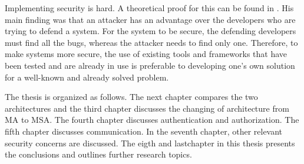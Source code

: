\begin{sloppypar}
    Implementing security is hard. A theoretical proof for this can be found in
    \citet{andersson2001information}. His main finding was that an attacker has
    an advantage over the developers who are trying to defend a system. For the system
    to be secure, the defending developers must find all the bugs, whereas the
    attacker needs to find only one. Therefore, to make systems more secure, the use
    of existing tools and frameworks that have been tested and are already in use is
    preferable to developing one's own solution for a well-known and already
    solved problem.
\end{sloppypar}
\begin{sloppypar}
    The thesis is organized as follows. The next chapter compares the two
    architectures and the third chapter discusses the changing of architecture
    from MA to MSA. The fourth chapter discusses authentication and
    authorization. The fifth chapter discusses communication. In the seventh
    chapter, other relevant security concerns are discussed. The eigth and
    lastchapter in this thesis presents the conclusions and outlines further
    research topics.
\end{sloppypar}




